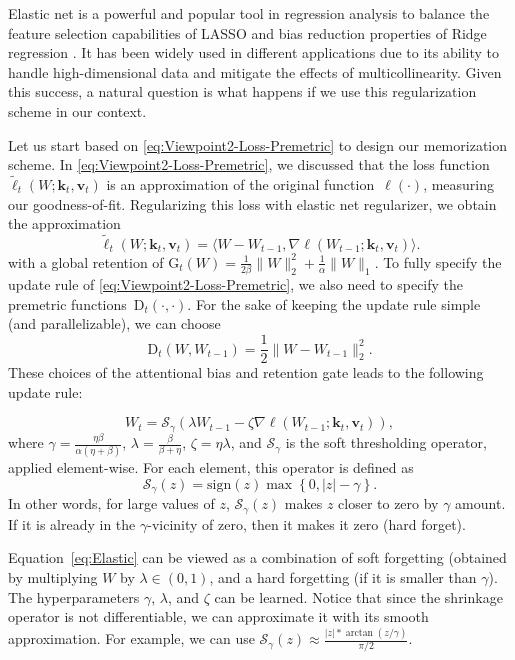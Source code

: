 \documentclass{article}
\newcommand{\citep}{\parencite}
\newcommand{\vk}[0]{\mathbf{k}}
\newcommand{\vvv}[0]{\mathbf{v}}
\theoremstyle{plain}
\theoremstyle{definition}
\theoremstyle{remark}
\newcommand{\head}[1]{\vspace{1.7mm}\noindent{{\textcolor{c2}{\bf #1.}}}}
\begin{document}
\head{Variant 2: Elastic Net Regularization: Hard and Soft Forgetting} 
Elastic net is a powerful and popular tool in regression analysis to balance the feature selection capabilities of LASSO \citep{tibshirani1996regression} and bias reduction properties of Ridge regression \citep{hilt1977ridge,hoerl1970ridge}. It has been widely used  in different applications due to its ability to handle high-dimensional data and mitigate the effects of multicollinearity. Given this success, a natural question is what happens if we use this regularization scheme in our context. 

Let us start based on \eqref{eq:Viewpoint2-Loss-Premetric} to design our memorization scheme. In \eqref{eq:Viewpoint2-Loss-Premetric}, we discussed that the loss function $\widetilde{\ell}_t(W;\vk_t, \vvv_t)$ is an approximation of the original function~$\ell(\cdot)$, measuring our goodness-of-fit. Regularizing this loss with elastic net regularizer, we obtain the approximation
\[
\widetilde{\ell}_t(W;\vk_t, \vvv_t)= \langle W-W_{t-1},\nabla \ell(W_{t-1};\vk_t, \vvv_t) \rangle.
\]
with a global retention of $\mbox{G}_t(W) = \frac{1}{2\beta} \|W\|_2^2 + \frac{1}{\alpha} \|W\|_1$. 
To fully specify the update rule of \eqref{eq:Viewpoint2-Loss-Premetric}, we also need to specify the premetric functions~$\mbox{D}_t(\cdot,\cdot)$. For the sake of keeping the update rule simple (and parallelizable), we can choose
\[
\mbox{D}_t(W,W_{t-1}) = \frac{1}{2}\|W-W_{t-1}\|_2^2.
\]
These choices of the attentional bias and retention gate leads to the following update rule:


\begin{equation}\label{eq:Elastic}
    W_t = \mathcal{S}_{\gamma} \left( \lambda W_{t-1} - \zeta \nabla \ell(W_{t-1};\vk_t, \vvv_t)\right),
\end{equation}
where $\gamma =  \frac{\eta \beta}{\alpha(\eta + \beta)}$, $\lambda = \frac{\beta}{\beta+\eta}$, $\zeta = \eta \lambda$, and $\mathcal{S}_{\gamma}$ is the soft thresholding operator, applied element-wise. For each element,  this operator is defined as
\[
 \mathcal{S}_{\gamma}(z) = \mbox{sign}(z) \max\left\{0, |z| - \gamma\right\}.
\]
In other words, for large values of $z$, $ \mathcal{S}_{\gamma}(z)$ makes $z$ closer to zero by $\gamma$ amount. If it is already in the $\gamma$-vicinity of zero, then it makes it zero (hard forget). 

Equation~\eqref{eq:Elastic} can be viewed as a combination of soft forgetting (obtained by multiplying $W$ by $\lambda \in (0,1)$, and a hard forgetting (if it is smaller than $\gamma$). The hyperparameters $\gamma$, $\lambda$, and $\zeta$ can be learned.
Notice that since the shrinkage operator is not  differentiable, we can  approximate it with its smooth approximation. For example, we can use
$\mathcal{S}_{\gamma}(z) \approx \frac{|z| * \arctan(z / \gamma)}{\pi / 2}$.
\end{document}
